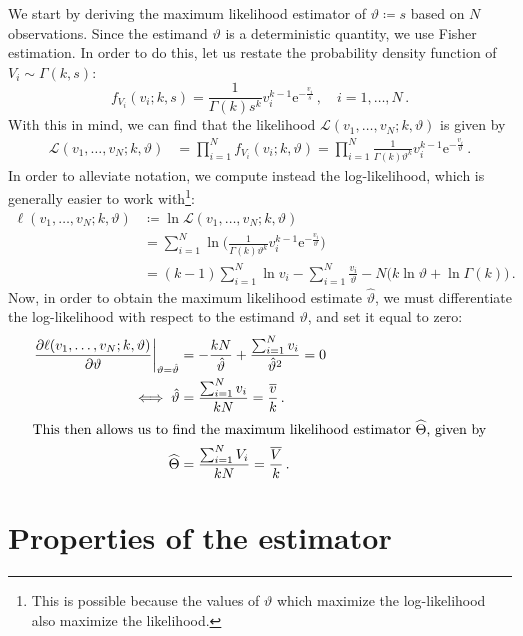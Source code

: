 \documentclass[final]{aomart}
\newtheorem[{}\it]{thm}{Theorem}[section]
\theoremstyle{definition}
\newtheorem*[{}\it]{notation}{Notation}
\numberwithin{equation}{section}
\newcommand{\wh}{\widehat}
\renewcommand{\theta}{\vartheta}
\newcommand{\like}{\mathcal{L}} %
\newcommand{\e}{\mathrm{e}} %
\newcommand{\pdf}{f} %
\newcommand{\htheta}{\hat{\theta}} %
\newcommand{\hTheta}{\wh{\Theta}} %
\newcommand{\eval}[2][\right]{\relax
  \ifx#1\right\relax \left.\fi#2#1\rvert}
\begin{document}
We start by deriving the maximum likelihood estimator of \(\theta \coloneqq s\) based on \(N\) observations.
Since the estimand $\theta$ is a deterministic quantity, we use Fisher estimation.
In order to do this, let us restate the probability density function of \(V_i \sim \Gamma(k, s)\):
\begin{equation}
\pdf_{V_i}(v_i; k, s) = \frac{1}{\Gamma(k) s^k} v_i^{k-1} \e^{-\frac{v_i}{s}}\,, \quad i = 1, \ldots, N\,.\label{eq:gamma}
\end{equation}
With this in mind, we can find that the likelihood \(\like(v_1, \ldots, v_N; k, \theta)\) is given by
\begin{align}
\like(v_1, \ldots, v_N; k, \theta) &= \prod_{i=1}^{N} \pdf_{V_i}(v_i; k,\theta) = \prod_{i=1}^{N} \frac{1}{\Gamma(k) \theta^k} v_i^{k-1} \e^{-\frac{v_i}{\theta}}\,.
\end{align}
In order to alleviate notation, we compute instead the log-likelihood, which is generally easier to work with\footnote{This is possible because the values of \(\theta\) which maximize the log-likelihood also maximize the likelihood.}:
\begin{align}
\ell(v_1, \ldots, v_N; k, \theta) &\coloneqq \ln \like(v_1, \ldots, v_N; k, \theta)\\
&= \sum_{i=1}^{N} \ln\Bigg(\frac{1}{\Gamma(k) \theta^k} v_i^{k-1} \e^{-\frac{v_i}{\theta}}\Bigg)\\
&= (k-1) \sum_{i=1}^{N}\ln v_i - \sum_{i=1}^{N} \frac{v_i}{\theta} - N \big(k \ln \theta + \ln \Gamma(k)\big)\,.\label{eq:loglikelihood}
\end{align}
Now, in order to obtain the maximum likelihood estimate \(\htheta\), we must differentiate the log-likelihood with respect to the estimand \(\theta\), and set it equal to zero:
\begin{align}
\eval{\frac{\partial \ell(v_1, \ldots, v_N; k, \theta)}{\partial \theta}}_{\theta = \htheta} &= -\frac{kN}{\htheta} + \frac{\sum_{i=1}^{N} v_i}{\htheta^2} = 0\\
\iff \htheta &= \frac{\sum_{i=1}^{N} v_i}{kN} = \frac{\widebar{v}}{k}\,.\\
\intertext{This then allows us to find the maximum likelihood estimator \(\hTheta\), given by}
\hTheta &= \frac{\sum_{i=1}^{N} V_i}{kN} = \frac{\widebar{V}}{k}\,.\label{eq:mlestimator}
\end{align}

\section{Properties of the estimator}
\end{document}
